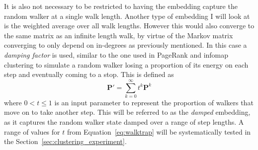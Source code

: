 It is also not necessary to be restricted to having the embedding capture the random walker at a single walk length. Another type of embedding I will look at is the weighted average over all walk lengths. However this would also converge to the same matrix as an infinite length walk, by virtue of the Markov matrix converging to only depend on in-degrees as previously mentioned. In this case a \emph{damping factor} is used, similar to the one used in PageRank \cite{Page1999} and infomap clustering \cite{Rosvall2008} to simulate a random walker losing a proportion of its energy on each step and eventually coming to a stop. This is defined as
\begin{equation}
  \mathbf{P}' = \sum_{k=0}^\infty t^k\mathbf{P}^{k}
  \label{eq:damped}
\end{equation}
where $0<t\leq 1$ is an input parameter to represent the proportion of walkers that move on to take another step. This will be referred to as the \emph{damped} embedding, as it captures the random walker state damped over a range of step lengths. A range of values for $t$ from Equation~\eqref{eq:walktrap} will be systematically tested in the Section~\ref{sec:clustering_experiment}.

